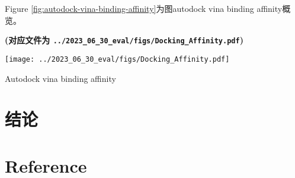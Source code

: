 \documentclass[
]{article}
\begin{document}
Figure \ref{fig:autodock-vina-binding-affinity}为图autodock vina binding affinity概览。

\textbf{(对应文件为 \texttt{../2023\_06\_30\_eval/figs/Docking\_Affinity.pdf})}

\def\@captype{figure}
\begin{center}
\texttt{[image: ../2023\_06\_30\_eval/figs/Docking\_Affinity.pdf]}
\caption{Autodock vina binding affinity}\label{fig:autodock-vina-binding-affinity}
\end{center}

\hypertarget{dis}{%
\section{结论}\label{dis}}

\hypertarget{bibliography}{%
\section*{Reference}\label{bibliography}}
\end{document}
